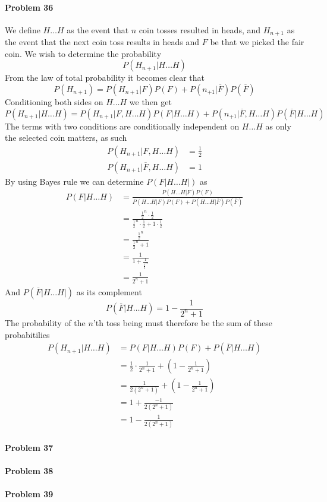 \paragraph{Problem 36}
We define $H\ldots H$ as the event that $n$ coin tosses resulted in heads, and $H_{n+1}$ as the event that the next coin toss results in heads and $F$ be that we picked the fair coin. We wish to determine the probability
\[
    P(H_{n+1}|H\ldots H)
\]
From the law of total probability it becomes clear that
\[
    P(H_{n+1})=P(H_{n+1}|F)P(F)+P(n_{+1}|\overline{F})P(\overline{F})
\]
Conditioning both sides on $H\ldots H$ we then get
\[
    P(H_{n+1}|H\ldots H)=P(H_{n+1}|F,H\ldots H)P(F|H\ldots H)+P(n_{+1}|\overline{F},H\ldots H)P(\overline{F}|H\ldots H)
\]
The terms with two conditions are conditionally independent on $H\ldots H$ as only the selected coin matters, as such
\begin{align*}
    P(H_{n+1}|F,H\ldots H)&=\frac{1}{2} \\
    P(H_{n+1}|\overline{F},H\ldots H)&=1
\end{align*}
By using Bayes rule we can determine $P(F|H\ldots H|)$ as
\begin{align*}
    P(F|H\ldots H)&=\frac{P(H\ldots H|F)P(F)}{P(H\ldots H|F)P(F)+P(H\ldots H|\overline{F})P(\overline{F})} \\
             &=\frac{\frac{1}{2}^{n}\cdot \frac{1}{2}}{\frac{1}{2}^{n}\cdot\frac{1}{2}+1\cdot\frac{1}{2}} \\
             &=\frac{\frac{1}{2}^{n}}{\frac{1}{2}^{n}+1} \\
             &=\frac{1}{1+\frac{1}{\frac{1}{2}^{n}}} \\
             &=\frac{1}{2^{n}+1}
\end{align*}
And $P(\overline{F}|H\ldots H|)$ as its complement
\[
    P(\overline{F}|H\ldots H)=1-\frac{1}{2^{n}+1}
\]
The probability of the $n$'th toss being must therefore be the sum of these probabitilies
\begin{align*}
    P(H_{n+1}|H\ldots H)&=P(F|H\ldots H)P(F)+P(\overline{F}|H\ldots H) \\
                  &=\frac{1}{2}\cdot\frac{1}{2^{n}+1}+\left(1-\frac{1}{2^{n}+1}\right) \\
                  &=\frac{1}{2(2^{n}+1)}+\left(1-\frac{1}{2^{n}+1}\right) \\
                  &=1+\frac{-1}{2(2^{n}+1)} \\
                  &=1-\frac{1}{2(2^{n}+1)}
\end{align*}
\paragraph{Problem 37}
\paragraph{Problem 38}
\paragraph{Problem 39}
